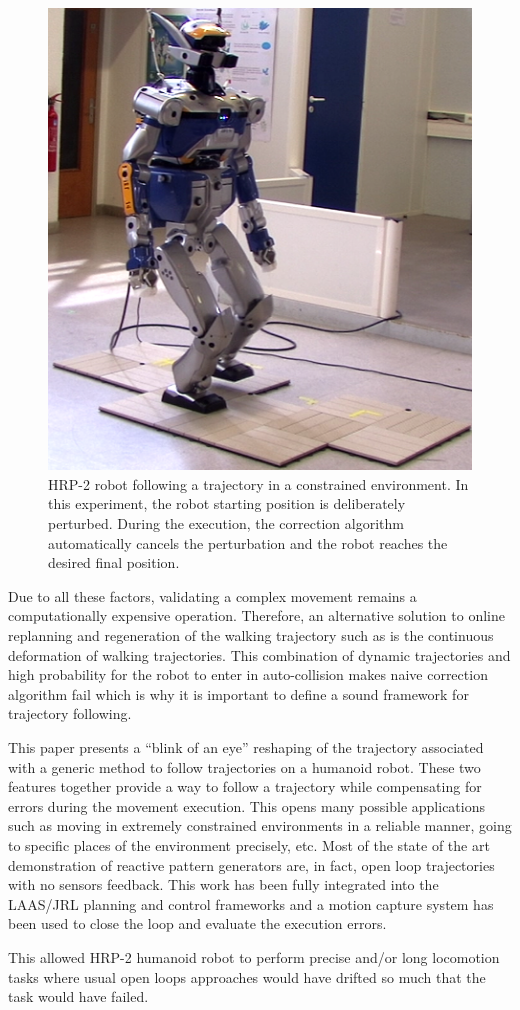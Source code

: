\begin{figure}[ht!]
  \begin{center}
    \includegraphics[width=.45\textwidth]{fig/exp.png}
  \end{center}
  \caption{HRP-2 robot following a trajectory in a constrained
    environment. In this experiment, the robot starting position is
    deliberately perturbed. During the execution, the correction algorithm
    automatically cancels the perturbation and the robot reaches the
    desired final position. \label{fig:following}}
\end{figure}



Due to all these factors, validating a complex movement remains a
computationally expensive operation. Therefore, an alternative
solution to online replanning and regeneration of the walking
trajectory such as \cite{11icra.dimitrov, 10ar.herdt,
  06icra.nishiwaki, 05humanoids.michel} is the continuous deformation
of walking trajectories.  This combination of dynamic trajectories and
high probability for the robot to enter in auto-collision makes naive
correction algorithm fail which is why it is important to define a
sound framework for trajectory following.


This paper presents a ``blink of an eye'' reshaping of the trajectory
associated with a generic method to follow trajectories on a humanoid
robot. These two features together provide a way to follow a
trajectory while compensating for errors during the movement
execution. This opens many possible applications such as moving in
extremely constrained environments in a reliable manner, going to
specific places of the environment precisely, etc. Most of the state
of the art demonstration of reactive pattern generators are, in fact,
open loop trajectories with no sensors feedback. This work has been
fully integrated into the LAAS/JRL planning and control frameworks and
a motion capture system has been used to close the loop and evaluate
the execution errors.

This allowed HRP-2 humanoid robot to perform precise and/or long
locomotion tasks where usual open loops approaches would have drifted
so much that the task would have failed.

\FloatBarrier

